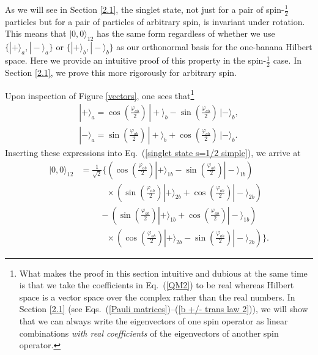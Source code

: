 As we will see in Section \ref{2.1}, the singlet state, not just for a pair of spin-$\frac12$ particles but for a  pair of particles of arbitrary spin, is invariant under rotation. This means that $|0, 0 \rangle_{12}$ has the same form regardless of whether we use $\{ |+ \rangle_a, |- \rangle_a \}$ or $\{ |+ \rangle_b, |- \rangle_b \}$ as our orthonormal basis for the one-banana Hilbert space. Here we provide an intuitive proof of this property in the spin-$\frac12$ case. In Section \ref{2.1}, we prove this more rigorously for arbitrary spin.

Upon inspection of Figure \ref{vectors}, one sees that\footnote{What makes the proof in this section intuitive and dubious at the same time is that we take the coefficients in Eq.\ (\ref{QM2}) to be real whereas Hilbert space is a vector space over the complex rather than the real numbers. In Section \ref{2.1} (see Eqs.\ (\ref{Pauli matrices})--(\ref{b +/- trans law 2})), we will show that we can always write the eigenvectors of one spin operator as linear combinations \emph{with real coefficients} of the eigenvectors of another spin operator.}
\begin{equation}
\begin{array}{c}
|+ \rangle_a = \cos{\! \left( {\displaystyle \frac{\varphi_{ab}}{2}} \right)} \, |+ \rangle_b - \sin{\! \left( {\displaystyle \frac{\varphi_{ab}}{2}} \right)} \, |- \rangle_b, \\[.6cm]
|- \rangle_a = \sin{\! \left( {\displaystyle \frac{\varphi_{ab}}{2}} \right)} \, |+ \rangle_b + \cos{\! \left( {\displaystyle \frac{\varphi_{ab}}{2}} \right)} \, |- \rangle_b.
\end{array}
\label{QM2}
\end{equation}
Inserting these expressions into Eq.\ (\ref{singlet state s=1/2 simple}), we arrive at
\begin{align}
|0, 0 \rangle_{12} &= \frac{1}{\sqrt{2}} \Big\{ \! \left(  \cos{\! \left( \frac{\varphi_{ab}}{2} \right)}  |+ \rangle_{1b} - \sin{\! \left(  \frac{\varphi_{ab}}{2} \right)} |- \rangle_{1b} \! \right) \nonumber\\
& \qquad \quad \times \left(  \sin{\! \left(  \frac{\varphi_{ab}}{2}  \right)} |+ \rangle_{2b} + \cos{\! \left(  \frac{\varphi_{ab}}{2} \right)} |- \rangle_{2b} \!  \right) 
 \nonumber \\
  & \qquad \; - \left( \sin{\! \left(  \frac{\varphi_{ab}}{2}  \right)}  |+ \rangle_{1b} + \cos{\! \left(  \frac{\varphi_{ab}}{2}  \right)} |- \rangle_{1b} \right) \nonumber\\
 & \qquad \quad \times \!\! \left( \cos{\! \left(  \frac{\varphi_{ab}}{2}  \right)} |+ \rangle_{2b} - \sin{\! \left(  \frac{\varphi_{ab}}{2}  \right)} |- \rangle_{2b}  \right) \! \Big\}.  
 \nonumber
 \end{align}
